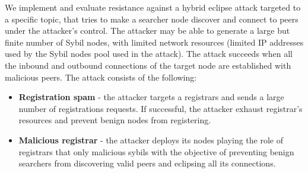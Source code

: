 We implement and evaluate \sysname resistance against a hybrid eclipse attack targeted to a specific topic,  that  tries to make a searcher node discover and connect to peers under the attacker's control.  
The attacker may be able to generate a large but finite number of Sybil nodes,  with limited network resources (\ie limited IP addresses used by the Sybil nodes pool used in the attack).
The attack succeeds when all the inbound and outbound connections of the target node are established with malicious peers.  The attack consists of the following:
\begin{itemize}
    \item \textbf{Registration spam} - the attacker targets a registrars and sends a large number of registrations requests. If successful, the attacker exhaust registrar's resources and prevent benign nodes from registering. 
	\item \textbf{Malicious registrar} - the attacker deploys its nodes playing the role of registrars that only malicious sybils with the objective of preventing benign searchers from discovering valid peers and eclipsing all its connections. 
\end{itemize}


